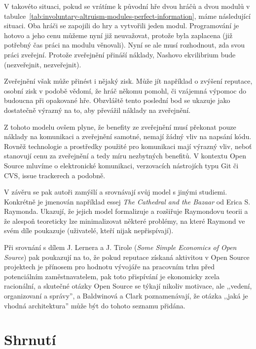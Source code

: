 \begin{multicols}{2}
		V takovéto situaci, pokud se vrátíme k původní hře dvou hráčů a dvou modulů v tabulce~\ref{tab:involuntary-altruism-modules-perfect-information}, máme následující situaci. Oba hráči se zapojili do hry a vytvořili jeden modul. Programování je hotovo a jeho cenu můžeme nyní již neuvažovat, protože byla zaplacena (již potřebný čas práci na modulu věnovali). Nyní se ale musí rozhodnout, zda svou práci zveřejní. Protože zveřejnění přináší náklady, Nashovo ekvilibrium bude (nezveřejnit, nezveřejnit).

		Zveřejnění však může přinést i nějaký zisk. Může jít například o zvýšení reputace, osobní zisk v podobě vědomí, že hráč někomu pomohl, či vzájemná výpomoc do budoucna při opakované hře. Obzvláště tento poslední bod se ukazuje jako dostatečně výrazný na to, aby převážil náklady na zveřejnění.

		Z tohoto modelu ovšem plyne, že benefity ze zveřejnění musí překonat pouze náklady na komunikaci a zveřejnění samotné, nemají žádný vliv na napsání kódu. Rovněž technologie a prostředky použité pro komunikaci mají výrazný vliv, neboť stanovují cenu za zveřejnění a tedy míru nezbytných benefitů. V kontextu Open Source mluvíme o elektronické komunikaci,  verzovacích nástrojích typu Git či CVS, issue trackerech a podobně.

		V závěru se pak autoři zamýšlí a srovnávají svůj model s jinými studiemi. Konkrétně je jmenován například essej {\em The Cathedral and the Bazaar} od Erica S. Raymonda. Ukazují, že jejich model formalizuje a rozšiřuje Raymondovu teorii a že alespoň teoreticky lze minimalizovat některé problémy, na které Raymond ve svém díle poukazuje (uživatelé, kteří nijak nepřispívají).

	 	Při srovnání s dílem J. Lernera a J. Tirole ({\em Some Simple Economics of Open Source}) pak poukazují na to, že pokud reputace získaná aktivitou v Open Source projektech je přínosem pro hodnotu vývojáře na pracovním trhu před potenciálním zaměstnavatelem, pak toto přispívání je ekonomicky zcela racionální, a skutečné otázky Open Source se týkají nikoliv motivace, ale ,,vedení, organizovaní a správy'', a Baldwinová a Clark poznamenávají, že otázka ,,jaká je vhodná architektura'' může být do tohoto seznamu přidána.


\section{Shrnutí}








%

\end{multicols}
